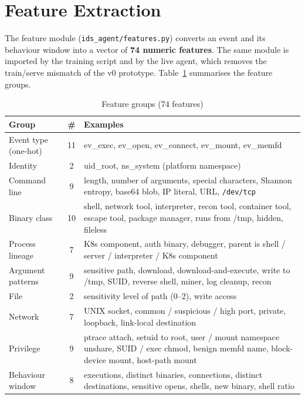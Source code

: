 \section{Feature Extraction}

The feature module (\texttt{ids\_agent/features.py}) converts an event and its
behaviour window into a vector of \textbf{74 numeric features}. The same module is
imported by the training script and by the live agent, which removes the
train/serve mismatch of the v0 prototype. Table~\ref{tab:features} summarises the
feature groups.

\begin{table}[H]
\centering
\caption{Feature groups (74 features)}
\label{tab:features}
\small
\begin{tabularx}{\textwidth}{>{\raggedright\arraybackslash}p{3.3cm} c >{\raggedright\arraybackslash}X}
\toprule
\textbf{Group} & \textbf{\#} & \textbf{Examples} \\
\midrule
Event type (one-hot) & 11 & ev\_exec, ev\_open, ev\_connect, ev\_mount, ev\_memfd \\
Identity & 2 & uid\_root, ns\_system (platform namespace) \\
Command line & 9 & length, number of arguments, special characters, Shannon entropy, base64 blob, IP literal, URL, \texttt{/dev/tcp} \\
Binary class & 10 & shell, network tool, interpreter, recon tool, container tool, escape tool, package manager, runs from /tmp, hidden, fileless \\
Process lineage & 7 & K8s component, auth binary, debugger, parent is shell / server / interpreter / K8s component \\
Argument patterns & 9 & sensitive path, download, download-and-execute, write to /tmp, SUID, reverse shell, miner, log cleanup, recon \\
File & 2 & sensitivity level of path (0--2), write access \\
Network & 7 & UNIX socket, common / suspicious / high port, private, loopback, link-local destination \\
Privilege & 9 & ptrace attach, setuid to root, user / mount namespace unshare, SUID / exec chmod, benign memfd name, block-device mount, host-path mount \\
Behaviour window & 8 & executions, distinct binaries, connections, distinct destinations, sensitive opens, shells, new binary, shell ratio \\
\bottomrule
\end{tabularx}
\end{table}

